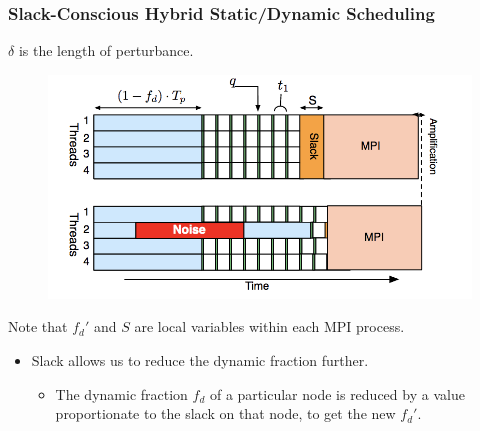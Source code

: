 \begin{frame}[label=slackfs]
\frametitle{Slack-Conscious Hybrid Static/Dynamic Scheduling}
\begin{center}
{\small $\delta$ is the length of perturbance.} 
\end{center}
\begin{figure}
  \begin{center}
    \includegraphics[scale=0.41]{./images/slackConsciousSched}
  \end{center}
\end{figure}
\begin{center}
\end{center}
\begin{center}
{\tiny Note that $f_d'$ and $S$ are local variables within each MPI process.}
\end{center}


\begin{itemize}
\small \item \small Slack allows us to reduce the dynamic fraction
further. 
\begin{itemize}
\tiny \item \tiny The dynamic fraction $f_d$ of a particular node is reduced by a value proportionate to the slack on that node, to get the new $f_d'$.
\end{itemize}
\end{itemize}
\end{frame}

